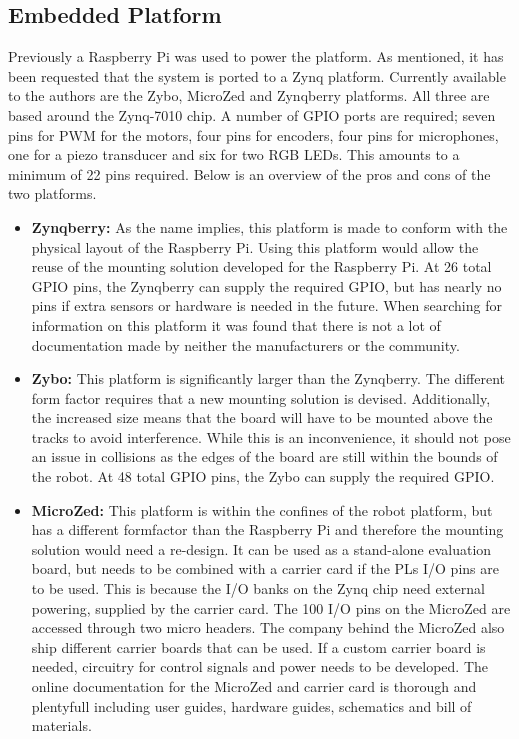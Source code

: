 \subsection{Embedded Platform} %
\label{sub:embedded_platform}
Previously a Raspberry Pi was used to power the platform.
As mentioned, it has been requested that the system is ported to a Zynq platform.
Currently available to the authors are the Zybo, MicroZed and Zynqberry platforms.
All three are based around the Zynq-7010 chip.
A number of GPIO ports are required; seven pins for PWM for the motors, four pins for encoders, four pins for microphones, one for a piezo transducer and six for two RGB LEDs.
This amounts to a minimum of 22 pins required.
Below is an overview of the pros and cons of the two platforms.
\begin{itemize}
	\item \textbf{Zynqberry:} As the name implies, this platform is made to conform with the physical layout of the Raspberry Pi.
	Using this platform would allow the reuse of the mounting solution developed for the Raspberry Pi.
	At 26 total GPIO pins, the Zynqberry can supply the required GPIO, but has nearly no pins if extra sensors or hardware is needed in the future.
	When searching for information on this platform it was found that there is not a lot of documentation made by neither the manufacturers or the community.
	\item \textbf{Zybo:} This platform is significantly larger than the Zynqberry.
	The different form factor requires that a new mounting solution is devised.
	Additionally, the increased size means that the board will have to be mounted above the tracks to avoid interference.
	While this is an inconvenience, it should not pose an issue in collisions as the edges of the board are still within the bounds of the robot.
	At 48 total GPIO pins, the Zybo can supply the required GPIO.
	\item \textbf{MicroZed:}
	This platform is within the confines of the robot platform, but has a different formfactor than the Raspberry Pi and therefore the mounting solution would need a re-design.
	It can be used as a stand-alone evaluation board, but needs to be combined with a carrier card if the PLs I/O pins are to be used.
	This is because the I/O banks on the Zynq chip need external powering, supplied by the carrier card.
	The 100 I/O pins on the MicroZed are accessed through two micro headers.
	The company behind the MicroZed also ship different carrier boards that can be used.
	If a custom carrier board is needed, circuitry for control signals and power needs to be developed.
	The online documentation for the MicroZed and carrier card is thorough and plentyfull including user guides, hardware guides, schematics and bill of materials.
\end{itemize}
